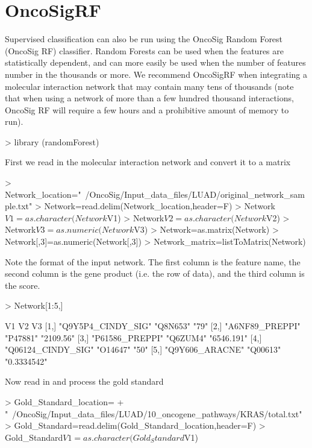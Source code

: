 \documentclass{article}
\begin{document}
\section*{OncoSigRF}
Supervised classification can also be run using the OncoSig Random Forest (OncoSig RF) classifier. Random Forests can be used when the features are statistically dependent, and can more easily be used when the number of features number in the thousands or more. We recommend OncoSigRF when integrating a molecular interaction network that may contain many tens of thousands (note that when using a network of more than a few hundred thousand interactions, OncoSig RF will require a few hours and a prohibitive amount of memory to run).

\begin{Schunk}
\begin{Sinput}
> library (randomForest)
\end{Sinput}
\end{Schunk}
First we read in the molecular interaction network and convert it to a matrix
\begin{Schunk}
\begin{Sinput}
> Network_location="~/OncoSig/Input_data_files/LUAD/original_network_sample.txt"
> Network=read.delim(Network_location,header=F)
> Network$V1=as.character(Network$V1)
> Network$V2=as.character(Network$V2)
> Network$V3=as.numeric(Network$V3)
> Network=as.matrix(Network)
> Network[,3]=as.numeric(Network[,3])
> Network_matrix=listToMatrix(Network)
\end{Sinput}
\end{Schunk}
Note the format of the input network. The first column is the feature name, the second column is the gene product (i.e. the row of data), and the third column is the score.
\begin{Schunk}
\begin{Sinput}
> Network[1:5,]
\end{Sinput}
\begin{Soutput}
     V1                 V2       V3         
[1,] "Q9Y5P4_CINDY_SIG" "Q8N653" "79"       
[2,] "A6NF89_PREPPI"    "P47881" "2109.56"  
[3,] "P61586_PREPPI"    "Q6ZUM4" "6546.191" 
[4,] "Q06124_CINDY_SIG" "O14647" "50"       
[5,] "Q9Y606_ARACNE"    "Q00613" "0.3334542"
\end{Soutput}
\end{Schunk}

Now read in and process the gold standard
\begin{Schunk}
\begin{Sinput}
> Gold_Standard_location=
+   "~/OncoSig/Input_data_files/LUAD/10_oncogene_pathways/KRAS/total.txt"
> Gold_Standard=read.delim(Gold_Standard_location,header=F)
> Gold_Standard$V1=as.character(Gold_Standard$V1)
\end{Sinput}
\end{Schunk}
\end{document}
